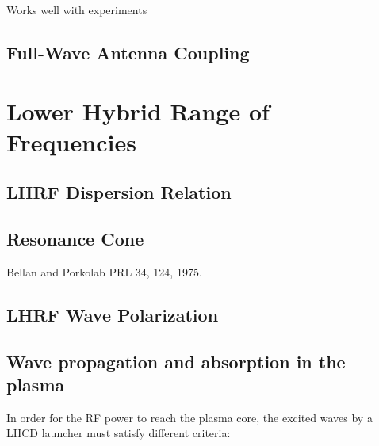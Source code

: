 Works well with experiments

\subsection{Full-Wave Antenna Coupling}\label{sec:ICRH_FW_antena_coupling}





\section{Lower Hybrid Range of Frequencies}\label{sec:lhcd}

\subsection{LHRF Dispersion Relation}

\subsection{Resonance Cone}
Bellan and Porkolab PRL 34, 124, 1975.

\subsection{LHRF Wave Polarization}


\subsection{Wave propagation and absorption in the plasma}
In order for the RF power to reach the plasma core, the excited waves by a LHCD launcher must satisfy different criteria: 

